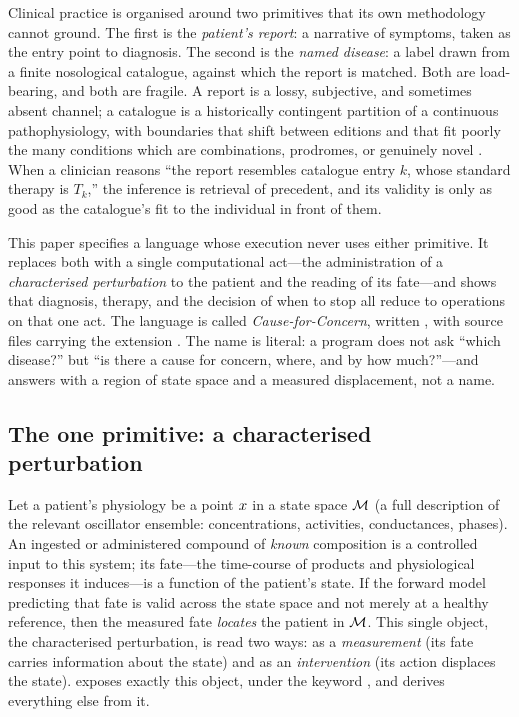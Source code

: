 Clinical practice is organised around two primitives that its own
methodology cannot ground. The first is the \emph{patient's report}: a
narrative of symptoms, taken as the entry point to diagnosis. The second is
the \emph{named disease}: a label drawn from a finite nosological catalogue,
against which the report is matched. Both are load-bearing, and both are
fragile. A report is a lossy, subjective, and sometimes absent channel; a
catalogue is a historically contingent partition of a continuous
pathophysiology, with boundaries that shift between editions and that fit
poorly the many conditions which are combinations, prodromes, or genuinely
novel \citep{feinstein1967clinical,scheuermann2009toward,loscalzo2007network}.
When a clinician reasons ``the report resembles catalogue entry $k$, whose
standard therapy is $T_k$,'' the inference is retrieval of precedent, and its
validity is only as good as the catalogue's fit to the individual in front of
them.

This paper specifies a language whose execution never uses either primitive.
It replaces both with a single computational act---the administration of a
\emph{characterised perturbation} to the patient and the reading of its
fate---and shows that diagnosis, therapy, and the decision of when to stop all
reduce to operations on that one act. The language is called
\emph{Cause-for-Concern}, written , with source files carrying the
extension . The name is literal: a  program does not ask
``which disease?'' but ``is there a cause for concern, where, and by how
much?''---and answers with a region of state space and a measured
displacement, not a name.

\subsection{The one primitive: a characterised perturbation}

Let a patient's physiology be a point $x$ in a state space $\mathcal{M}$ (a full
description of the relevant oscillator ensemble: concentrations, activities,
conductances, phases). An ingested or administered compound of \emph{known}
composition is a controlled input to this system; its fate---the time-course
of products and physiological responses it induces---is a function of the
patient's state. If the forward model predicting that fate is valid across the
state space and not merely at a healthy reference, then the measured fate
\emph{locates} the patient in $\mathcal{M}$. This single object, the characterised
perturbation, is read two ways: as a \emph{measurement} (its fate carries
information about the state) and as an \emph{intervention} (its action
displaces the state).  exposes exactly this object, under the keyword
, and derives everything else from it.

